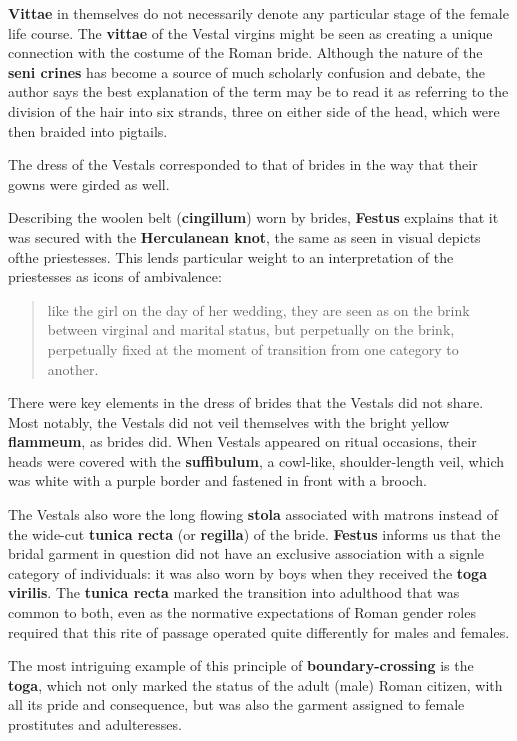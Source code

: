 \textbf{Vittae} in themselves do not necessarily denote any particular stage of the female life course. The \textbf{vittae} of the Vestal virgins might be seen as creating a unique connection with the costume of the Roman bride. Although the nature of the \textbf{seni crines} has become a source of much scholarly confusion and debate, the author says the best explanation of the term may be to read it as referring to the division of the hair into six strands, three on either side of the head, which were then braided into pigtails.

\begin{rmk}
    The dress of the Vestals corresponded to that of brides in the way that their gowns were girded as well.
\end{rmk}

Describing the woolen belt (\textbf{cingillum}) worn by brides, \textbf{Festus} explains that it was secured with the \textbf{Herculanean knot}, the same as seen in visual depicts ofthe priestesses. This lends particular weight to an interpretation of the priestesses as icons of ambivalence:
\begin{quotation}
    like the girl on the day of her wedding, they are seen as on the brink between virginal and marital status, but perpetually on the brink, perpetually fixed at the moment of transition from one category to another.
\end{quotation}

There were key elements in the dress of brides that the Vestals did not share. Most notably, the Vestals did not veil themselves with the bright yellow \textbf{flammeum}, as brides did. When Vestals appeared on ritual occasions, their heads were covered with the \textbf{suffibulum}, a cowl-like, shoulder-length veil, which was white with a purple border and fastened in front with a brooch.

The Vestals also wore the long flowing \textbf{stola} associated with matrons instead of the wide-cut \textbf{tunica recta} (or \textbf{regilla}) of the bride. \textbf{Festus} informs us that the bridal garment in question did not have an exclusive association with a signle category of individuals: it was also worn by boys when they received the \textbf{toga virilis}. The \textbf{tunica recta} marked the transition into adulthood that was common to both, even as the normative expectations of Roman gender roles required that this rite of passage operated quite differently for males and females.


The most intriguing example of this principle of \textbf{boundary-crossing} is the \textbf{toga}, which not only marked the status of the adult (male) Roman citizen, with all its pride and consequence, but was also the garment assigned to female prostitutes and adulteresses.

